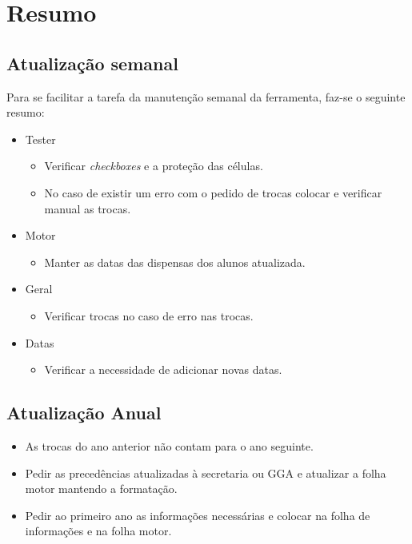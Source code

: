 \section{Resumo}

\subsection{Atualização semanal}
Para se facilitar a tarefa da manutenção semanal da ferramenta, faz-se o seguinte resumo:

\begin{itemize}
    \item Tester
    \begin{itemize}
        \item Verificar \textit{checkboxes} e a proteção das células.
        \item No caso de existir um erro com o pedido de trocas colocar e verificar manual as trocas.
    \end{itemize}
    \item Motor
    \begin{itemize}
        \item Manter as datas das dispensas dos alunos atualizada.
    \end{itemize}
    \item Geral
    \begin{itemize}
        \item Verificar trocas no caso de erro nas trocas.
    \end{itemize}
    \item Datas
    \begin{itemize}
        \item Verificar a necessidade de adicionar novas datas.
    \end{itemize}
\end{itemize}

\subsection{Atualização Anual}

\begin{itemize}
    \item As trocas do ano anterior não contam para o ano seguinte.
    \item Pedir as precedências atualizadas à secretaria ou GGA e atualizar a folha motor mantendo a formatação.
    \item Pedir ao primeiro ano as informações necessárias e colocar na folha de informações e na folha motor.
\end{itemize}

